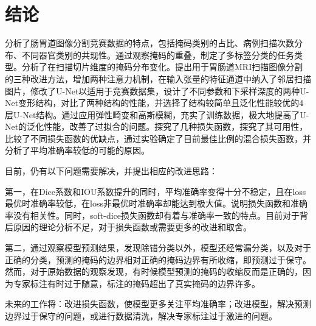 \documentclass[letterpaper, 10pt, conference, twoside]{ieeeconf}
\begin{document}
\section{结论}

分析了肠胃道图像分割竞赛数据的特点，包括掩码类别的占比、病例扫描次数分布、不同器官类别的共现性。通过观察掩码的重叠，制定了多标签分类的任务类型。分析了在扫描切片维度的掩码分布变化。提出用于胃肠道MRI扫描图像分割的三种改进方法，增加两种注意力机制，在输入张量的特征通道中纳入了邻居扫描图片，修改了U-Net以适用于竞赛数据集，设计了不同参数和下采样深度的两种U-Net变形结构，对比了两种结构的性能，并选择了结构较简单且泛化性能较优的4层U-Net结构。通过应用弹性畸变和高斯模糊，充实了训练数据，极大地提高了U-Net的泛化性能，改善了过拟合的问题。探究了几种损失函数，探究了其可用性，比较了不同损失函数的优缺点，通过实验确定了目前最佳比例的混合损失函数，并分析了平均准确率较低的可能的原因。

目前，仍有以下问题需要解决，并提出相应的改进思路：

第一，在Dice系数和IOU系数提升的同时，平均准确率变得十分不稳定，且在loss最优时准确率较低，在loss非最优时准确率却能达到极大值。说明损失函数和准确率没有相关性。同时，soft-dice损失函数却有着与准确率一致的特点。目前对于背后原因的理论分析不足，对于损失函数或需要更多的改进和取舍。

第二，通过观察模型预测结果，发现除错分类以外，模型还经常漏分类，以及对于正确的分类，预测的掩码的边界相对正确的掩码边界有所收缩，即预测过于保守。然而，对于原始数据的观察发现，有时候模型预测的掩码的收缩反而是正确的，因为专家标注有时过于随意，标注的掩码超出了真实掩码的边界许多。

未来的工作将：改进损失函数，使模型更多关注平均准确率；改进模型，解决预测边界过于保守的问题，或进行数据清洗，解决专家标注过于激进的问题。
\end{document}
